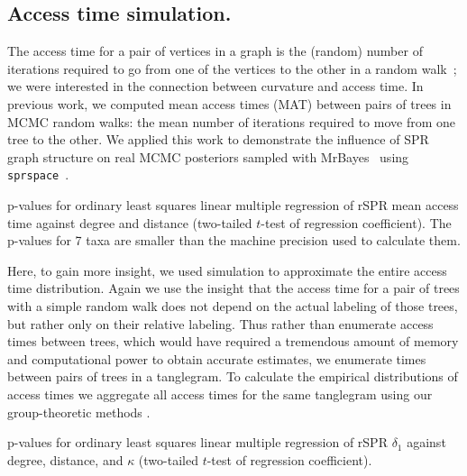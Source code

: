 \documentclass[]{elsarticle}
\let\MYoriglatexcaption\caption
\renewcommand{\caption}[2][\relax]{\MYoriglatexcaption[#2]{#2}}
\begin{document}
\subsection{Access time simulation.}
The access time for a pair of vertices in a graph is the (random) number of iterations required to go from one of the vertices to the other in a random walk~\citep{lovasz1993random}; we were interested in the connection between curvature and access time.
In previous work, we computed mean access times (MAT) between pairs of trees in  MCMC random walks: the mean number of iterations required to move from one tree to the other.
We applied this work to demonstrate the influence of SPR graph structure on real MCMC posteriors sampled with MrBayes~\citep{Whidden2015-yi} using \texttt{sprspace}~\citep{sprspace}.

\begin{table}
\centering
\caption{p-values for ordinary least squares linear multiple regression of rSPR mean access time against degree and distance (two-tailed $t$-test of regression coefficient). The p-values for 7 taxa are smaller than the machine precision used to calculate them.}
\label{tab:regressionMAT}
\end{table}

Here, to gain more insight, we used simulation to approximate the entire access time distribution.
Again we use the insight that the access time for a pair of trees with a simple random walk does not depend on the actual labeling of those trees, but rather only on their relative labeling.
Thus rather than enumerate access times between trees, which would have required a tremendous amount of memory and computational power to obtain accurate estimates, we enumerate times between pairs of trees in a tanglegram.
To calculate the empirical distributions of access times we aggregate all access times for the same tanglegram using our group-theoretic methods \citep{tangle}.

\begin{table}
\centering
\caption{p-values for ordinary least squares linear multiple regression of rSPR $\delta_1$ against degree, distance, and $\kappa$ (two-tailed $t$-test of regression coefficient).}
\label{tab:regressionDelta}
\vspace{2em}
\end{table}
\end{document}
